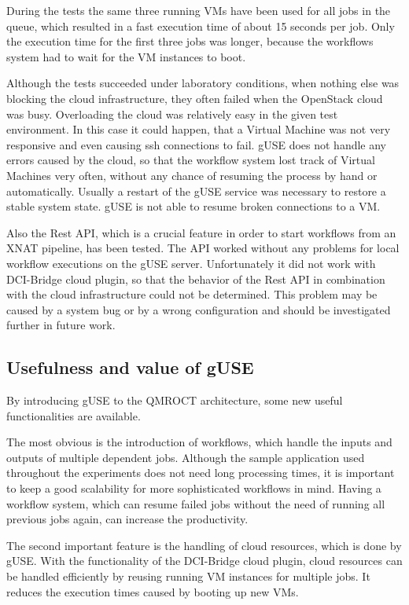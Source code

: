 During the tests the same three running VMs have been used for all jobs in the queue, which resulted in a fast execution time of about 15 seconds per job.
Only the execution time for the first three jobs was longer, because the workflows system had to wait for the VM instances to boot.

Although the tests succeeded under laboratory conditions, when nothing else was blocking the cloud infrastructure, they often failed when the OpenStack cloud was busy.
Overloading the cloud was relatively easy in the given test environment.
In this case it could happen, that a Virtual Machine was not very responsive and even causing ssh connections to fail.
gUSE does not handle any errors caused by the cloud, so that the workflow system lost track of Virtual Machines very often, without any chance of resuming the process by hand or automatically.
Usually a restart of the gUSE service was necessary to restore a stable system state.
gUSE is not able to resume broken connections to a VM.

Also the Rest API, which is a crucial feature in order to start workflows from an XNAT pipeline, has been tested.
The API worked without any problems for local workflow executions on the gUSE server.
Unfortunately it did not work with DCI-Bridge cloud plugin, so that the behavior of the Rest API in combination with the cloud infrastructure could not be determined.
This problem may be caused by a system bug or by a wrong configuration and should be investigated further in future work.

\subsection{Usefulness and value of gUSE}\label{usefulness}

By introducing gUSE to the QMROCT architecture, some new useful functionalities are available.

The most obvious is the introduction of workflows, which handle the inputs and outputs of multiple dependent jobs.
Although the sample application used throughout the experiments does not need long processing times, it is important to keep a good scalability for more sophisticated workflows in mind.
Having a workflow system, which can resume failed jobs without the need of running all previous jobs again, can increase the productivity.
 
The second important feature is the handling of cloud resources, which is done by gUSE.
With the functionality of the DCI-Bridge cloud plugin, cloud resources can be handled efficiently by reusing running VM instances for multiple jobs. It reduces the execution times caused by booting up new VMs.

